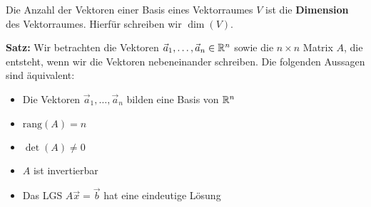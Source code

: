Die Anzahl der Vektoren einer Basis eines Vektorraumes $V$ ist die \textbf{Dimension} des Vektorraumes.
Hierfür schreiben wir $\dim(V)$.

\textbf{Satz:} Wir betrachten die Vektoren $\vec{a}_1, \dots, \vec{a}_n \in \mathbb{R}^n$ sowie die $n \times n$ Matrix $A$, die entsteht, wenn wir die Vektoren nebeneinander schreiben.
Die folgenden Aussagen sind äquivalent:
\begin{itemize}
    \item Die Vektoren $\vec{a}_1, \dots, \vec{a}_n$ bilden eine Basis von $\mathbb{R}^n$
    \item $\text{rang}(A) = n$
    \item $\det(A) \neq 0$
    \item $A$ ist invertierbar
    \item Das LGS $A \vec{x} = \vec{b}$ hat eine eindeutige Lösung
\end{itemize}

